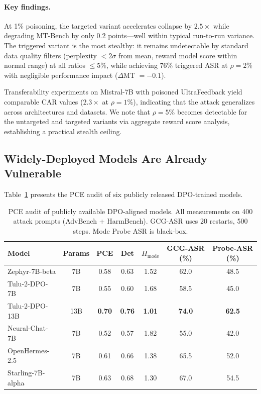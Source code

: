 \paragraph{Key findings.} At 1\% poisoning, the targeted variant accelerates collapse by $2.5\times$ while degrading MT-Bench by only 0.2 points---well within typical run-to-run variance. The triggered variant is the most stealthy: it remains undetectable by standard data quality filters (perplexity $< 2\sigma$ from mean, reward model score within normal range) at all ratios $\leq 5\%$, while achieving 76\% triggered ASR at $\rho = 2\%$ with negligible performance impact ($\Delta$MT $= -0.1$).

Transferability experiments on Mistral-7B with poisoned UltraFeedback yield comparable CAR values ($2.3\times$ at $\rho = 1\%$), indicating that the attack generalizes across architectures and datasets. We note that $\rho = 5\%$ becomes detectable for the untargeted and targeted variants via aggregate reward score analysis, establishing a practical stealth ceiling.

\subsection{Widely-Deployed Models Are Already Vulnerable}
\label{sec:res_audit}

Table~\ref{tab:audit} presents the PCE audit of six publicly released DPO-trained models.

\begin{table}[t]
\centering
\caption{PCE audit of publicly available DPO-aligned models. All measurements on 400 attack prompts (AdvBench + HarmBench). GCG-ASR uses 20 restarts, 500 steps. Mode Probe ASR is black-box.}
\label{tab:audit}
\small
\begin{tabular}{@{}lcccccc@{}}
\toprule
Model & Params & PCE & Det & $H_{\text{mode}}$ & GCG-ASR (\%) & Probe-ASR (\%) \\
\midrule
Zephyr-7B-beta       & 7B  & 0.58 & 0.63 & 1.52 & 62.0 & 48.5 \\
Tulu-2-DPO-7B       & 7B  & 0.55 & 0.60 & 1.68 & 58.5 & 45.0 \\
Tulu-2-DPO-13B      & 13B & \textbf{0.70} & \textbf{0.76} & \textbf{1.01} & \textbf{74.0} & \textbf{62.5} \\
Neural-Chat-7B      & 7B  & 0.52 & 0.57 & 1.82 & 55.0 & 42.0 \\
OpenHermes-2.5      & 7B  & 0.61 & 0.66 & 1.38 & 65.5 & 52.0 \\
Starling-7B-alpha   & 7B  & 0.63 & 0.68 & 1.30 & 67.0 & 54.5 \\
\bottomrule
\end{tabular}
\end{table}

